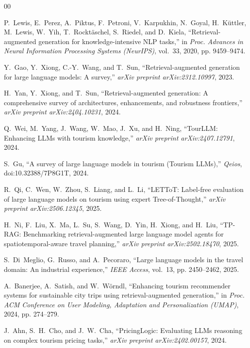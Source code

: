 \documentclass{ieeeaccess}
\begin{document}
\begin{thebibliography}{00}

P.~Lewis, E.~Perez, A.~Piktus, F.~Petroni, V.~Karpukhin, N.~Goyal, H.~Küttler, M.~Lewis, W.~Yih, T.~Rocktäschel, S.~Riedel, and D.~Kiela, 
``Retrieval-augmented generation for knowledge-intensive NLP tasks,'' 
in \emph{Proc. Advances in Neural Information Processing Systems (NeurIPS)}, vol.~33, 2020, pp. 9459--9474.

Y.~Gao, Y.~Xiong, C.-Y.~Wang, and T.~Sun, 
``Retrieval-augmented generation for large language models: A survey,'' 
\emph{arXiv preprint arXiv:2312.10997}, 2023.

H.~Yan, Y.~Xiong, and T.~Sun, 
``Retrieval-augmented generation: A comprehensive survey of architectures, enhancements, and robustness frontiers,'' 
\emph{arXiv preprint arXiv:2404.10231}, 2024.

Q.~Wei, M.~Yang, J.~Wang, W.~Mao, J.~Xu, and H.~Ning, 
``TourLLM: Enhancing LLMs with tourism knowledge,'' 
\emph{arXiv preprint arXiv:2407.12791}, 2024.

S.~Gu, 
``A survey of large language models in tourism (Tourism LLMs),'' 
\emph{Qeios}, doi:10.32388/7P8G1T, 2024.

R.~Qi, C.~Wen, W.~Zhou, S.~Liang, and L.~Li, 
``LETToT: Label-free evaluation of large language models on tourism using expert Tree-of-Thought,'' 
\emph{arXiv preprint arXiv:2506.12345}, 2025.

H.~Ni, F.~Liu, X.~Ma, L.~Su, S.~Wang, D.~Yin, H.~Xiong, and H.~Liu, 
``TP-RAG: Benchmarking retrieval-augmented large language model agents for spatiotemporal-aware travel planning,'' 
\emph{arXiv preprint arXiv:2502.18470}, 2025.

S.~Di~Meglio, G.~Russo, and A.~Pecoraro, 
``Large language models in the travel domain: An industrial experience,'' 
\emph{IEEE Access}, vol.~13, pp. 2450--2462, 2025.

A.~Banerjee, A.~Satish, and W.~Wörndl, 
``Enhancing tourism recommender systems for sustainable city trips using retrieval-augmented generation,'' 
in \emph{Proc. ACM Conference on User Modeling, Adaptation and Personalization (UMAP)}, 2024, pp. 274--279.

J.~Ahn, S.~H.~Cho, and J.~W.~Cha, 
``PricingLogic: Evaluating LLMs reasoning on complex tourism pricing tasks,'' 
\emph{arXiv preprint arXiv:2402.00157}, 2024.


\end{thebibliography}
\end{document}
